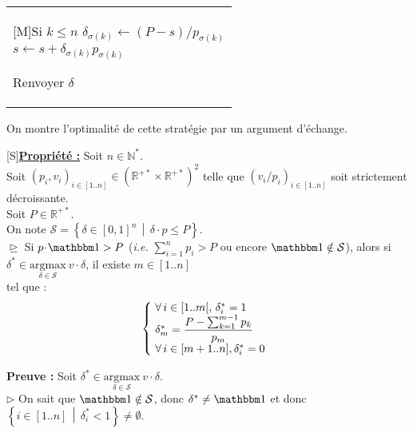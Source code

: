 \documentclass{article}
\renewcommand{\cal}[1]{\mathcal{#1}}
\newcommand{\bb}[1]{\mathbb{#1}}
\newcommand{\elt}[1]{\textbf{#1}}
\newcommand{\dotp}{\! \cdot \!}
\newcommand{\x}{\! \times \!}
\newcommand{\1}{\bbm{1}}
\begin{document}
				\\
				\hspace*{10mm}
				\begin{tabular}{|| l}
					\parbox{150mm}{
						\begin{center}[M]{Si $k \leq n$}
							\( \delta_{\sigma(k)} \leftarrow (P - s)/p_{\sigma(k)} \) \\
							\( s \leftarrow s + \delta_{\sigma(k)} p_{\sigma(k)} \)
						\end{center}
						Renvoyer $\delta$
					}
				\end{tabular}
			
			On montre l'optimalité de cette stratégie par un argument d'échange.
				\\[0mm]
			\begin{center}[S]{\elt{\underline{Propriété :}}}
				Soit $n \in \bb{N}^*$. \\
				Soit \( (p_i, v_i)_{i \in [1..n]} \in (\bb{R}^{+*} \x \bb{R}^{+*})^2 \) telle que \( \left( v_i/p_i \right)_{i \in [1..n]} \) soit strictement décroissante. \\[-0.8mm]
				Soit $P \in \bb{R}^{+*}$. \\
				On note \( \cal{S} = \left\{ \delta \in [0, 1]^n \, \middle| \, \delta \dotp p \leq P \right\} \).
				\\[1mm]
				$\trianglerighteq$ Si \( p \dotp \1 > P \) (\emph{i.e.} \( \displaystyle \sum_{i=1}^n p_i > P \) ou encore \( \1 \notin \cal{S} \)), alors si \( \delta^* \in \underset{\delta \in \cal{S}}{\mathrm{argmax}} \: v \dotp \delta \), il existe \( m \in [1..n] \) \\[-3.2mm] tel que :
				\\[-8mm] \renewcommand{\arraystretch}{1.2}
					\[
						\left\lbrace \hspace{-1mm}
						\begin{tabular}{l}
							\( \forall \, i \in [1..m[, \, \delta^*_i = 1 \) \\
							\( \delta^*_m = \displaystyle \frac{P - \sum_{k=1}^{m-1} p_k}{p_m} \) \\
							\( \forall \, i \in [m+1..n], \delta^*_i = 0 \)
						\end{tabular} \right.
					\]
				\renewcommand{\arraystretch}{1}
			\end{center}
			\elt{Preuve :} Soit \( \delta^* \in \underset{\delta \in \cal{S}}{\mathrm{argmax}} \: v \dotp \delta \). \\
			$\triangleright$ On sait que $\1 \notin \cal{S}$, donc $\delta^* \neq \1$ et donc \( \left\{ i \in [1..n] \, \middle| \, \delta^*_i < 1 \right\} \neq \emptyset \).
\end{document}
